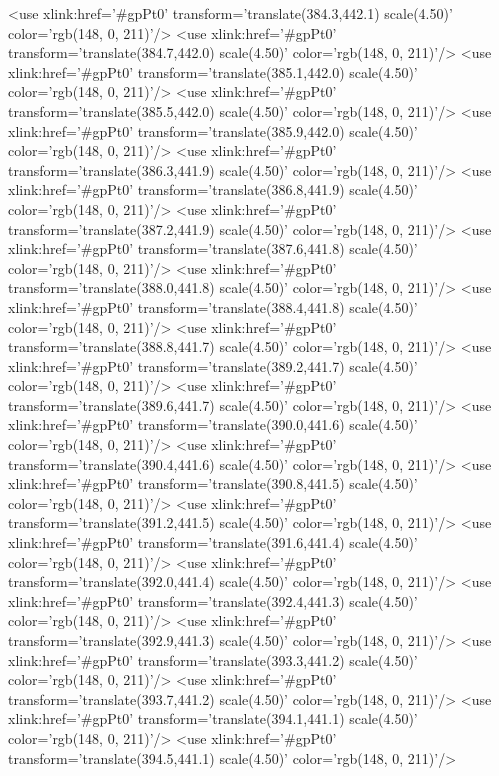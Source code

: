 	<use xlink:href='#gpPt0' transform='translate(384.3,442.1) scale(4.50)' color='rgb(148,   0, 211)'/>
	<use xlink:href='#gpPt0' transform='translate(384.7,442.0) scale(4.50)' color='rgb(148,   0, 211)'/>
	<use xlink:href='#gpPt0' transform='translate(385.1,442.0) scale(4.50)' color='rgb(148,   0, 211)'/>
	<use xlink:href='#gpPt0' transform='translate(385.5,442.0) scale(4.50)' color='rgb(148,   0, 211)'/>
	<use xlink:href='#gpPt0' transform='translate(385.9,442.0) scale(4.50)' color='rgb(148,   0, 211)'/>
	<use xlink:href='#gpPt0' transform='translate(386.3,441.9) scale(4.50)' color='rgb(148,   0, 211)'/>
	<use xlink:href='#gpPt0' transform='translate(386.8,441.9) scale(4.50)' color='rgb(148,   0, 211)'/>
	<use xlink:href='#gpPt0' transform='translate(387.2,441.9) scale(4.50)' color='rgb(148,   0, 211)'/>
	<use xlink:href='#gpPt0' transform='translate(387.6,441.8) scale(4.50)' color='rgb(148,   0, 211)'/>
	<use xlink:href='#gpPt0' transform='translate(388.0,441.8) scale(4.50)' color='rgb(148,   0, 211)'/>
	<use xlink:href='#gpPt0' transform='translate(388.4,441.8) scale(4.50)' color='rgb(148,   0, 211)'/>
	<use xlink:href='#gpPt0' transform='translate(388.8,441.7) scale(4.50)' color='rgb(148,   0, 211)'/>
	<use xlink:href='#gpPt0' transform='translate(389.2,441.7) scale(4.50)' color='rgb(148,   0, 211)'/>
	<use xlink:href='#gpPt0' transform='translate(389.6,441.7) scale(4.50)' color='rgb(148,   0, 211)'/>
	<use xlink:href='#gpPt0' transform='translate(390.0,441.6) scale(4.50)' color='rgb(148,   0, 211)'/>
	<use xlink:href='#gpPt0' transform='translate(390.4,441.6) scale(4.50)' color='rgb(148,   0, 211)'/>
	<use xlink:href='#gpPt0' transform='translate(390.8,441.5) scale(4.50)' color='rgb(148,   0, 211)'/>
	<use xlink:href='#gpPt0' transform='translate(391.2,441.5) scale(4.50)' color='rgb(148,   0, 211)'/>
	<use xlink:href='#gpPt0' transform='translate(391.6,441.4) scale(4.50)' color='rgb(148,   0, 211)'/>
	<use xlink:href='#gpPt0' transform='translate(392.0,441.4) scale(4.50)' color='rgb(148,   0, 211)'/>
	<use xlink:href='#gpPt0' transform='translate(392.4,441.3) scale(4.50)' color='rgb(148,   0, 211)'/>
	<use xlink:href='#gpPt0' transform='translate(392.9,441.3) scale(4.50)' color='rgb(148,   0, 211)'/>
	<use xlink:href='#gpPt0' transform='translate(393.3,441.2) scale(4.50)' color='rgb(148,   0, 211)'/>
	<use xlink:href='#gpPt0' transform='translate(393.7,441.2) scale(4.50)' color='rgb(148,   0, 211)'/>
	<use xlink:href='#gpPt0' transform='translate(394.1,441.1) scale(4.50)' color='rgb(148,   0, 211)'/>
	<use xlink:href='#gpPt0' transform='translate(394.5,441.1) scale(4.50)' color='rgb(148,   0, 211)'/>
